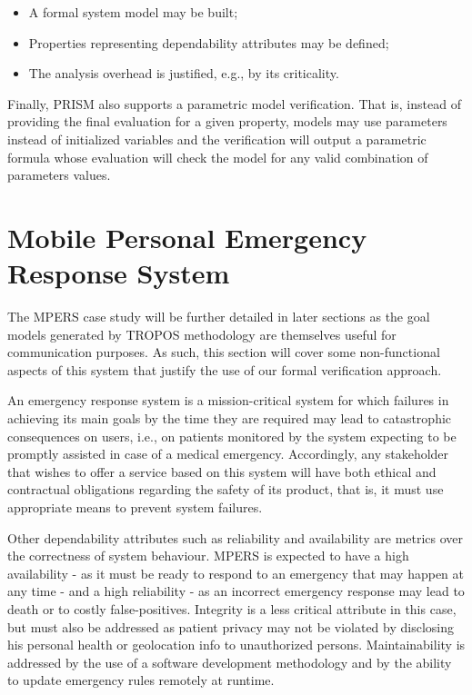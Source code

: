 \begin{itemize}

\item A formal system model may be built;
\medskip

\item Properties representing dependability attributes may be defined;
\medskip

\item The analysis overhead is justified, e.g., by its criticality.
\bigskip

\end{itemize}

Finally, PRISM also supports a parametric model verification. That is, instead of providing the final evaluation for a given property, models may use parameters instead of initialized variables and the verification will output a parametric formula whose evaluation will check the model for any valid combination of parameters values.

\section{Mobile Personal Emergency Response System}

The MPERS case study will be further detailed in later sections as the goal models generated by TROPOS methodology are themselves useful for communication purposes. As such, this section will cover some non-functional aspects of this system that justify the use of our formal verification approach.

An emergency response system is a mission-critical system for which failures in achieving its main goals by the time they are required may lead to catastrophic consequences on users, i.e., on patients monitored by the system expecting to be promptly assisted in case of a medical emergency. Accordingly, any stakeholder that wishes to offer a service based on this system will have both ethical and contractual obligations regarding the safety of its product, that is, it must use appropriate means to prevent system failures.

Other dependability attributes such as reliability and availability are metrics over the correctness of system behaviour. MPERS is expected to have a high availability - as it must be ready to respond to an emergency that may happen at any time - and a high reliability - as an incorrect emergency response may lead to death or to costly false-positives. Integrity is a less critical attribute in this case, but must also be addressed as patient privacy may not be violated by disclosing his personal health or geolocation info to unauthorized persons. Maintainability is addressed by the use of a software development methodology and by the ability to update emergency rules remotely at runtime.


